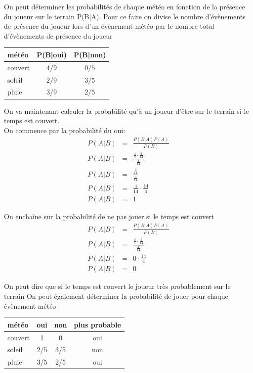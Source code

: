 \documentclass[a4paper,12pt]{article}
\begin{document}
				On peut déterminer les probabilités de chaque météo en fonction de la présence du joueur sur le terrain P(B|A). Pour ce faire on divise le nombre d'évènements de présence du joueur lors d'un évènement météo par le nombre total d'évènements de présence du joueur
				
				\begin{table}[H]
					\centering
					 \label{tab:pba}
					\begin{tabular}{|l|c|c|}
						\hline
						météo & P(B|oui) & P(B|non) \\
						\hline
						couvert & $4/9$ & $0/5$ \\
						\hline
						soleil & $2/9$ & $3/5$ \\
						\hline
						pluie & $3/9$ & $2/5$ \\
						\hline	
					\end{tabular}
				\end{table}
				
				On va maintenant calculer la probabilité qu'à un joueur d'être sur le terrain si le temps est couvert.\\
				On commence par la probabilité du oui:
				\begin{eqnarray*}
					P(A|B) &=& \frac{P(B|A)P(A)}{P(B)}\\
					P(A|B) &=& \frac{\frac{4}{9}\cdot\frac{9}{14}}{\frac{4}{14}}\\
					P(A|B) &=& \frac{\frac{4}{14}}{\frac{4}{14}}\\
					P(A|B) &=& \frac{4}{14}\cdot\frac{14}{4}\\
					P(A|B) &=& 1
				\end{eqnarray*}
				
				On enchaîne sur la probabilité de ne pas jouer si le temps est couvert
				\begin{eqnarray*}
					P(A|B) &=& \frac{P(B|A)P(A)}{P(B)}\\
					P(A|B) &=& \frac{\frac{0}{5}\cdot\frac{5}{14}}{\frac{4}{14}}\\
					P(A|B) &=& 0\cdot\frac{14}{4}\\
					P(A|B) &=& 0
				\end{eqnarray*}	
				
				On peut dire que si le temps est couvert le joueur très probablement sur le terrain			 
				On peut également déterminer la probabilité de jouer pour chaque évènement météo
				\begin{table}[H]
					\centering
					 \label{tab:pab2}
					\begin{tabular}{|l|c|c|c|}
						\hline
						météo & oui & non & plus probable\\
						\hline
						couvert & 1 & 0 & oui\\
						\hline
						soleil & 2/5 & 3/5 & non \\
						\hline
						pluie & 3/5 & 2/5 & oui \\
						\hline
					\end{tabular}
				\end{table}
				
\end{document}

